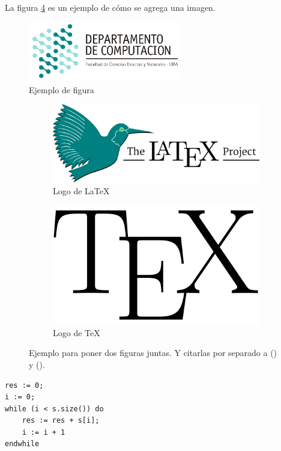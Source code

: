 \documentclass[10pt,a4paper]{article}
\begin{document}
La figura \ref{fig:subfigs} es un ejemplo de cómo se agrega una imagen.

\begin{figure}[ht]
	\centering
	\includegraphics[width=0.6\textwidth]{logo_dc.jpg}
	\caption{Ejemplo de figura}
	\label{fig:ejemplo}
\end{figure}

\begin{figure}[ht!]
	\begin{subfigure}{0.5\textwidth}
		\includegraphics[width=0.5\linewidth]{LaTeX-project} 
		\caption{Logo de LaTeX}
		\label{fig:subfig1}
	\end{subfigure}
	\begin{subfigure}{0.8\textwidth}
		\includegraphics[width=0.2\linewidth]{TeX}
		\caption{Logo de TeX}
		\label{fig:subfig2}
	\end{subfigure}
	\caption{Ejemplo para poner dos figuras juntas. Y citarlas por separado a () y ().}
	\label{fig:subfigs}
\end{figure}



	\begin{lstlisting}[caption={Ejemplo de código (usando los estilos de la cátedra, ver las macros para más detalles)},label=code:for]
res := 0;
i := 0;
while (i < s.size()) do
	res := res + s[i];
	i := i + 1
endwhile
	\end{lstlisting}
\end{document}
